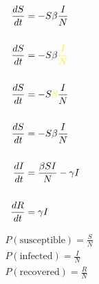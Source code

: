 \documentclass{article}
\begin{document}
\begin{align*}
\frac{dS}{dt} &= -S\beta\frac{ I}{N} \\
\\\frac{dS}{dt} &= -S\beta\textcolor{yellow}{\frac{ I}{N}} \\
\\\frac{dS}{dt} &= -S\textcolor{yellow}{\beta}\frac{ I}{N} \\
\\\frac{dS}{dt} &= -S\beta\frac{ I}{N} \\
\\\frac{dI}{dt} &= \frac{\beta S I}{N} - \gamma I \\
\\\frac{dR}{dt} &= \gamma I
\end{align*}

\begin{align*}
& P\left(\text{susceptible}\right) = \frac{S}{N} \\
& P\left(\text{infected}\right) = \frac{I}{N} \\
& P\left(\text{recovered}\right) = \frac{R}{N}
\end{align*}
\end{document}
